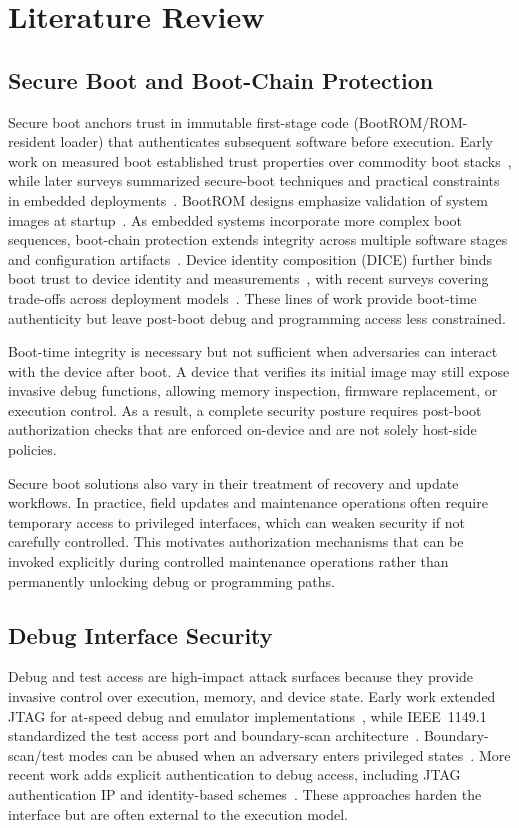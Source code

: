 \chapter{Literature Review}
\label{Chapter2}

\section{Secure Boot and Boot-Chain Protection}
Secure boot anchors trust in immutable first-stage code (BootROM/ROM-resident loader) that
authenticates subsequent software before execution. Early work on measured boot established
trust properties over commodity boot stacks~\cite{parno2010bootstrapping}, while later surveys
summarized secure-boot techniques and practical constraints in embedded
deployments~\cite{rv2018securebootreview}. BootROM designs emphasize validation of system images
at startup~\cite{bin2020bootrom}. As embedded systems incorporate more complex boot sequences,
boot-chain protection extends integrity across multiple software stages and configuration
artifacts~\cite{devic2011fpga}. Device identity composition (DICE) further binds boot trust to
device identity and measurements~\cite{jaeger2020diceharder}, with recent surveys covering
trade-offs across deployment models~\cite{wang2022securebootsurvey}. These lines of work provide
boot-time authenticity but leave post-boot debug and programming access less constrained.

Boot-time integrity is necessary but not sufficient when adversaries can interact with the device
after boot. A device that verifies its initial image may still expose invasive debug functions,
allowing memory inspection, firmware replacement, or execution control. As a result, a complete
security posture requires post-boot authorization checks that are enforced on-device and are not
solely host-side policies.

Secure boot solutions also vary in their treatment of recovery and update workflows. In practice,
field updates and maintenance operations often require temporary access to privileged interfaces,
which can weaken security if not carefully controlled. This motivates authorization mechanisms
that can be invoked explicitly during controlled maintenance operations rather than permanently
unlocking debug or programming paths.

\section{Debug Interface Security}
Debug and test access are high-impact attack surfaces because they provide invasive control over
execution, memory, and device state. Early work extended JTAG for at-speed debug and emulator
implementations~\cite{vandelogt2003jtag,chen2008jtagemu}, while IEEE~1149.1 standardized the test
access port and boundary-scan architecture~\cite{ieee1149_1}. Boundary-scan/test modes can be
abused when an adversary enters privileged states~\cite{ali2014boundaryscanattack}. More recent
work adds explicit authentication to debug access, including JTAG authentication IP and
identity-based schemes~\cite{lapeyre2022jtagauth,wang2020schnorrjtag,walimbe2014jtagaxi}. These
approaches harden the interface but are often external to the execution model.

